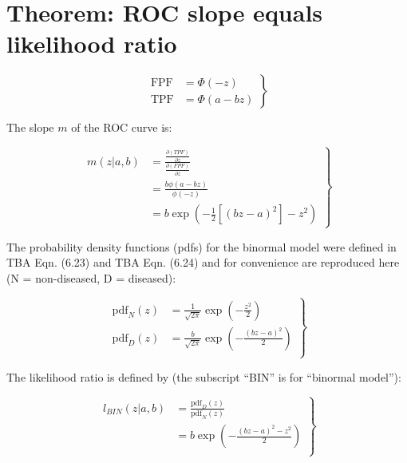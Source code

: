 \documentclass[
]{book}
\begin{document}
\hypertarget{proper-roc-models-likelihood-ratio-theorem1}{%
\section{Theorem: ROC slope equals likelihood ratio}\label{proper-roc-models-likelihood-ratio-theorem1}}

\begin{equation} 
\left.\begin{aligned}
\text{FPF}&=\Phi\left( -z \right)\\
\text{TPF}&=\Phi\left( a-bz \right)
\end{aligned}\right\}
\label{eq:proper-roc-models-binormal-model}
\end{equation}

The slope \(m\) of the ROC curve is:

\begin{equation} 
\left.\begin{aligned}
m\left( z|a,b \right)&=\frac{\frac{\partial \left( TPF \right)}{\partial z}}{\frac{\partial \left( FPF \right)}{\partial z}}\\ 
&=\frac{b\phi\left( a-bz \right)}{\phi\left( -z \right)}\\ 
&=b\exp\left( -\frac{1}{2} \left[ \left( bz-a \right)^2 \right]-z^2\right)
\end{aligned}\right\}
\label{eq:proper-roc-models-slope}
\end{equation}

The probability density functions (pdfs) for the binormal model were defined in TBA Eqn. (6.23) and TBA Eqn. (6.24) and for convenience are reproduced here (N = non-diseased, D = diseased):

\begin{equation} 
\left.\begin{aligned}
\text{pdf}_N\left( z \right) &= \frac{1}{\sqrt{2\pi}}\exp\left( -\frac{z^2}{2} \right) \\
\text{pdf}_D\left( z \right) &= \frac{b}{\sqrt{2\pi}}\exp\left( -\frac{\left( bz-a \right)^2}{2} \right) \\
\end{aligned}\right\}
\label{eq:proper-roc-models-pdfs}
\end{equation}

The likelihood ratio is defined by (the subscript ``BIN'' is for ``binormal model''):

\begin{equation} 
\left.\begin{aligned}
l_{BIN}\left( z | a,b\right) &= \frac{\text{pdf}_D\left( z \right)}{\text{pdf}_N\left( z \right)} \\
&= b\exp\left( -\frac{\left( bz-a \right)^2 -z^2}{2} \right) \\
\end{aligned}\right\}
\label{eq:proper-roc-models-likelihood-ratio}
\end{equation}
\end{document}
